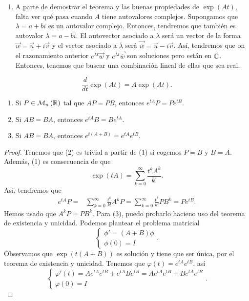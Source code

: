 \begin{observation}
\begin{enumerate}
\item A parte de demostrar el teorema y las buenas propiedades de $\displaystyle \exp\left(At\right) $, falta ver qué pasa cuando $\displaystyle A $ tiene autovalores complejos. Supongamos que $\displaystyle \lambda = a + bi $ es un autovalor complejo. Entonces, tendremos que también es autovalor $\displaystyle \overline{\lambda }=a - bi $. El autovector asociado a $\displaystyle \lambda  $ será un vector de la forma $\displaystyle \vec{w}=\vec{u}+i\vec{v} $ y el vector asociado a $\displaystyle \overline{\lambda } $ será $\displaystyle \vec{\overline{w}}=\vec{u}-i\vec{v} $. Así, tendremos que on el razonamiento anterior $\displaystyle e^{\lambda t}\vec{w} $ y $\displaystyle e^{\overline{\lambda }t}\vec{\overline{w}} $ son soluciones pero están en $\displaystyle \mathbb{C} $. 
Entonces, tenemos que buscar una combinación lineal de ellas que sea real. 
\end{enumerate}
\end{observation}
\begin{prop}
\[\frac{d}{dt}\exp\left(At\right)=A \exp\left(At\right) .\]
\end{prop}
\begin{prop}
\begin{enumerate}
\item Si $\displaystyle P \in \mathcal{M}_{n}\left(\mathbb{R}\right) $ tal que $\displaystyle AP = PB $, entonces $\displaystyle e^{tA}P=Pe^{tB}  $.
\item Si $\displaystyle AB = BA $, entonces $\displaystyle e^{tA}B = Be^{tA} $. 
\item Si $\displaystyle AB = BA $, entonces $\displaystyle e^{t\left(A + B\right)}= e^{tA}e^{tB} $. 
\end{enumerate}
\end{prop}
\begin{proof}
Tenemos que (2) es trivial a partir de (1) si cogemos $\displaystyle P = B $ y $\displaystyle B = A $. Además, (1) es consecuencia de que
\[\exp\left(tA\right)=\sum^{\infty}_{k = 0}\frac{t ^{k}A^{k}}{k!} .\]
Así, tendremos que 
\[
\begin{split}
	e^{tA}P = & \sum^{\infty}_{k = 0}\frac{t ^{k}}{k!}A^{k}P = \sum^{\infty}_{k = 0}\frac{t ^{k}}{k!}PB^{k}=Pe^{tB}.
\end{split}
\]
Hemos usado que $\displaystyle A^{k}P = PB^{k} $. Para (3), puedo probarlo hacieno uso del teorema de existencia y unicidad. Podemos plantear el problema matricial
\[
\begin{cases}
\phi'=\left(A + B\right)\phi \\
\phi\left(0\right)=I
\end{cases}
.\]
Observamos que $\displaystyle \exp\left(t\left(A + B\right)\right) $ es solución y tiene que ser única, por el teorema de existencia y unicidad. Tenemos que $\displaystyle \varphi\left(t\right)=e^{tA}e^{tB} $, así
\[
\begin{cases}
\varphi'\left(t\right)= Ae^{tA} e^{tB} + e^{tA}Be^{tB} = Ae^{tA}e^{tB}+Be^{tA}e^{tB}\\
\varphi\left(0\right)=I
\end{cases}
.\]
\end{proof}
